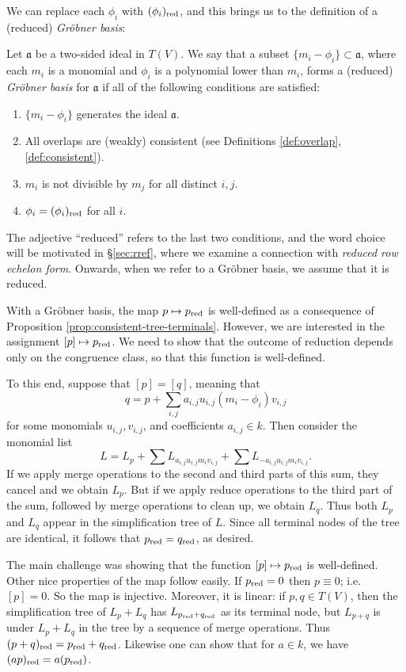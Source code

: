 We can replace each $\phi_i$ with $(\phi_i)_{\mathrm{red}}$, and this brings us to the definition of a (reduced) \emph{Gr\"obner basis}:
\begin{defn}\label{def:grobner}
	Let $\mathfrak{a}$ be a two-sided ideal in $T(V)$. We say that a subset $\{m_i - \phi_i\}\subset \mathfrak{a}$, where each $m_i$ is a monomial and $\phi_i$ is a polynomial lower than $m_i$, forms a (reduced) \emph{Gr\"obner basis} for $\mathfrak{a}$ if all of the following conditions are satisfied:
	\begin{enumerate}
		\item $\{m_i - \phi_i\}$ generates the ideal $\mathfrak{a}$.
		\item\label{item:grobnerconsistent} All overlaps are (weakly) consistent (see Definitions \ref{def:overlap}, \ref{def:consistent}).
		\item $m_i$ is not divisible by $m_j$ for all distinct $i,j$.
		\item $\phi_i = (\phi_i)_{\mathrm{red}}$ for all $i$.
	\end{enumerate}
\end{defn}
The adjective ``reduced'' refers to the last two conditions, and the word choice will be motivated in \S\ref{sec:rref}, where we examine a connection with \emph{reduced row echelon form}. Onwards, when we refer to a Gr\"obner basis, we assume that it is reduced.

With a Gr\"obner basis, the map $p\mapsto p_{\mathrm{red}}$ is well-defined as a consequence of Proposition \ref{prop:consistent-tree-terminals}. However, we are interested in the assignment $[p]\mapsto p_{\mathrm{red}}$. We need to show that the outcome of reduction depends only on the congruence class, so that this function is well-defined.

To this end, suppose that $[p] = [q]$, meaning that
\[
	q = p + \sum_{i,j} a_{i,j}u_{i,j} (m_i - \phi_i) v_{i,j}
\]
for some monomials $u_{i,j}, v_{i,j}$, and coefficients $a_{i,j}\in k$. Then consider the monomial list
\[
	L= L_p + \sum L_{a_{i,j}u_{i,j}m_iv_{i,j}} + \sum L_{-a_{i,j}u_{i,j}m_i v_{i,j}}.
\]
If we apply merge operations to the second and third parts of this sum, they cancel and we obtain $L_p$. But if we apply reduce operations to the third part of the sum, followed by merge operations to clean up, we obtain $L_q$. Thus both $L_p$ and $L_q$ appear in the simplification tree of $L$. Since all terminal nodes of the tree are identical, it follows that $p_{\mathrm{red}} = q_{\mathrm{red}}$, as desired.

The main challenge was showing that the function $[p] \mapsto p_{\mathrm{red}}$ is well-defined. Other nice properties of the map follow easily. If $p_{\mathrm{red}} = 0$ then $p \equiv 0$; i.e. $[p]=0$. So the map is injective. Moreover, it is linear: if $p,q\in T(V)$, then the simplification tree of $L_p + L_q$ has $L_{p_{\mathrm{red}}+q_{\mathrm{red}}}$ as its terminal node, but $L_{p+q}$ is under $L_p + L_q$ in the tree by a sequence of merge operations. Thus $(p+q)_{\mathrm{red}} = p_{\mathrm{red}} + q_{\mathrm{red}}$. Likewise one can show that for $a \in k$, we have $(ap)_{\mathrm{red}} = a(p_{\mathrm{red}})$.

